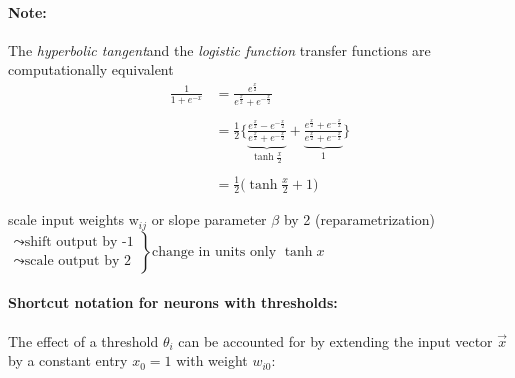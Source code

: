 \paragraph{Note:} The \emph{hyperbolic tangent}and the \emph{logistic function} transfer functions are computationally equivalent
\begin{equation}
	\begin{array}{ll}
	\frac{1}{1 + e^{-x}} 
	& = \frac{e^{\frac{x}{2}}}{e^{\frac{x}{2}} + e^{-\frac{x}{2}}} \\\\
	& = \frac{1}{2} \bigg\{
		\underbrace{\frac{e^{\frac{x}{2}} - e^{-\frac{x}{2}}}{
			e^{\frac{x}{2}} + e^{-\frac{x}{2}}}}_{
				\tanh \frac{x}{2}}
		+ \underbrace{\frac{e^{\frac{x}{2}} + e^{-\frac{x}{2}}}{
				e^{\frac{x}{2}} + e^{-\frac{x}{2}}}}_{1}
		\bigg\} \\\\
	& = \frac{1}{2} \big( \tanh \frac{x}{2} + 1 \big)
	\end{array}
\end{equation}
\begin{itemize}
	\itl scale input weights $\mathrm{w}_{ij}$ or slope parameter 
		$\beta$ by 2 (reparametrization)\\
	$\left.
	\begin{array}{l}
		\leadsto \text{shift output by -1} \\
		\leadsto \text{scale output by 2}
	\end{array}
	\right\} \text{change in units only} $
	\itR $\tanh x$
\end{itemize}



\paragraph{Shortcut notation for neurons with thresholds:} The effect of a threshold $\theta_i$ can be accounted for by extending the input vector $\vec{x}$ by a constant entry $x_0=1$ with weight $w_{i0}$:\\


